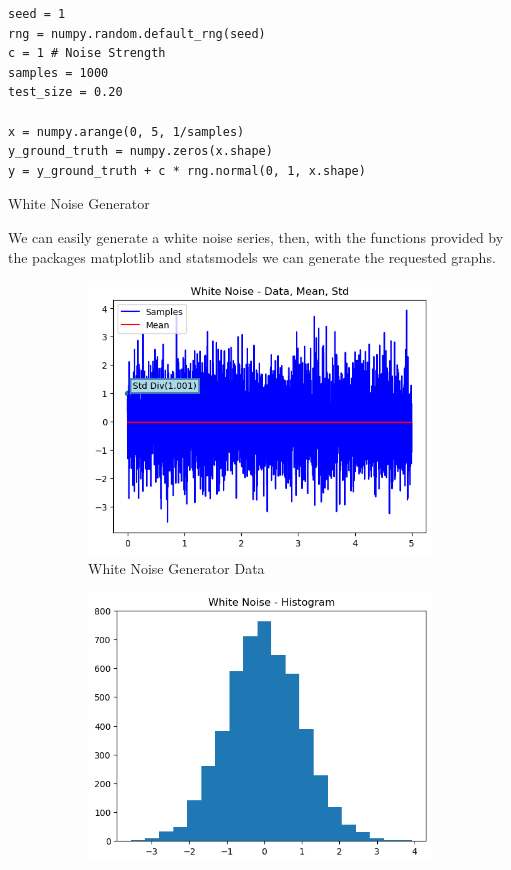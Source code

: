 \documentclass{article}
\begin{document}
\begin{listing}[!ht]
\begin{verbatim}
seed = 1
rng = numpy.random.default_rng(seed)
c = 1 # Noise Strength
samples = 1000
test_size = 0.20

x = numpy.arange(0, 5, 1/samples)
y_ground_truth = numpy.zeros(x.shape)
y = y_ground_truth + c * rng.normal(0, 1, x.shape)
\end{verbatim}
\caption{White Noise Generator}
\label{listing:gen_wn}
\end{listing}
We can easily generate a white noise series, then, with the functions provided by the packages matplotlib and statsmodels we can generate the requested graphs. 
\begin{figure}[htbp]
  \centering
  \begin{subfigure}[b]{0.45\textwidth}
    \includegraphics[width=\textwidth]{img/white_noise/data.png}
    \caption{White Noise Generator Data}
    \label{fig:Whitenoiselines}
  \end{subfigure}
  \hfill
  \begin{subfigure}[b]{0.45\textwidth}
    \includegraphics[width=\textwidth]{img/white_noise/histogram.png}

\end{subfigure}
\end{figure}
\end{document}
